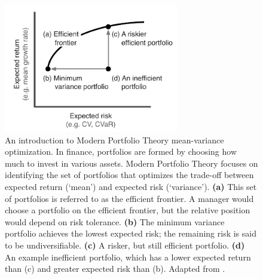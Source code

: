 \begin{figure}[htbp]
\centering \includegraphics[width=3in]{efficient-frontier-fig.pdf}
\caption{An introduction to Modern Portfolio Theory mean-variance optimization.
  In finance, portfolios are formed by choosing how much to invest in various
  assets. Modern Portfolio Theory focuses on identifying the set of portfolios
  that optimizes the trade-off between expected return (`mean') and expected
  risk (`variance'). \textbf{(a)} This set of portfolios is referred to as the
  efficient frontier. A manager would choose a portfolio on the efficient
  frontier, but the relative position would depend on risk tolerance.
  \textbf{(b)} The minimum variance portfolio achieves the lowest expected
  risk; the remaining risk is said to be undiversifiable. \textbf{(c)} A
  risker, but still efficient portfolio. \textbf{(d)} An example inefficient
  portfolio, which has a lower expected return than (c) and greater expected
  risk than (b). Adapted from \citet{hoekstra2012}.} \label{fig:mpt}
\end{figure}

\clearpage

